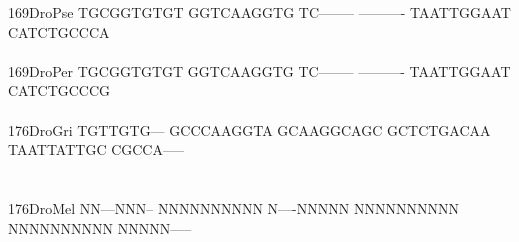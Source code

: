 \documentclass[11pt,twoside,reqno,a4paper]{article}
\begin{document}
{169\hspace*{1\charwidth}DroPse	TGCGGTGTGT	GGTCAAGGTG	TC--------	----------	TAATTGGAAT	CATCTGCCCA	\\
\hspace*{4\charwidth}\hspace*{7\charwidth}\hspace*{1\charwidth}\hspace*{1\charwidth}\hspace*{1\charwidth}\hspace*{1\charwidth}\hspace*{1\charwidth}\hspace*{1\charwidth}\\
169\hspace*{1\charwidth}DroPer	TGCGGTGTGT	GGTCAAGGTG	TC--------	----------	TAATTGGAAT	CATCTGCCCG	\\
\hspace*{4\charwidth}\hspace*{7\charwidth}\hspace*{1\charwidth}\hspace*{1\charwidth}\hspace*{1\charwidth}\hspace*{1\charwidth}\hspace*{1\charwidth}\hspace*{1\charwidth}\\
176\hspace*{1\charwidth}DroGri	TGTTGTG---	GCCCAAGGTA	GCAAGGCAGC	GCTCTGACAA	TAATTATTGC	CGCCA-----	\\
\hspace*{4\charwidth}\hspace*{7\charwidth}\hspace*{1\charwidth}\hspace*{1\charwidth}\hspace*{1\charwidth}\hspace*{1\charwidth}\hspace*{1\charwidth}\hspace*{1\charwidth}\\
\\
176\hspace*{1\charwidth}DroMel	NN---NNN--	NNNNNNNNNN	N----NNNNN	NNNNNNNNNN	NNNNNNNNNN	NNNNN-----	\\
\hspace*{4\charwidth}\hspace*{7\charwidth}\hspace*{1\charwidth}\hspace*{1\charwidth}\hspace*{1\charwidth}\hspace*{1\charwidth}\hspace*{1\charwidth}\hspace*{1\charwidth}\\
}
\end{document}
